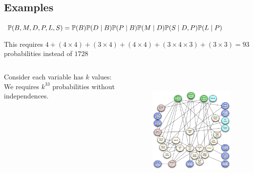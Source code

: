 \subsection{Examples}
	\begin{frame}[fragile]
		\begin{figure}
			\centering
			
		\end{figure}
		\begin{block}{}
			$\P( B , M , D , P , L , S ) = \P( B ) \P( D \mid B ) \P( P \mid B ) \P( M \mid D ) \P( S \mid D , P ) \P( L \mid P )$
		\end{block}
		This requires $4 + (4 \times 4) + (3 \times 4) + (4 \times 4) + (3 \times 4 \times 3) + (3 \times 3) = 93$ probabilities instead of $1728$
	\end{frame}
	
	\begin{frame}[fragile]
		\begin{columns}
			\begin{column}{.3\linewidth}
				Consider each variable has $k$ values:\\
				We requires $k^{33}$ probabilities without independences.
			\end{column}
			\begin{column}{.6\linewidth}
				\begin{figure}
					\centering
					\includegraphics[height=17em]{images/complexbn}
				\end{figure}
			\end{column}
		\end{columns}
		
	\end{frame}